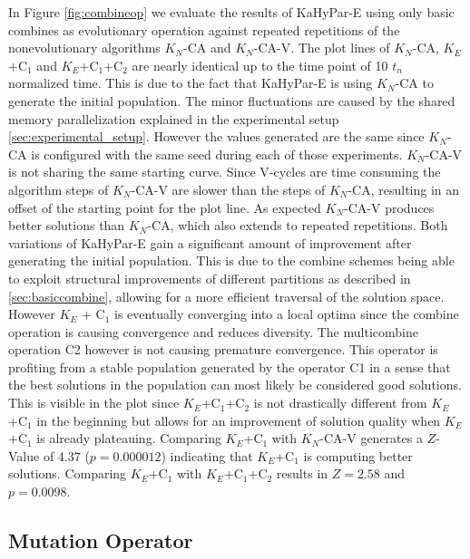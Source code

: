 \documentclass[a4paper,12pt,titlepage, BCOR7mm,headsepline]{scrbook}
\numberwithin{equation}{section}
\begin{document}
In Figure \ref{fig:combineop} we evaluate the results of KaHyPar-E using only basic combines as evolutionary operation against repeated repetitions of the nonevolutionary algorithms $K_N$-CA and $K_N$-CA-V. The plot lines of $K_N$-CA, $K_E$+C$_1$ and $K_E$+C$_1$+C$_2$ are nearly identical up to the time point of 10 $t_n$ normalized time. This is due to the fact that KaHyPar-E is using $K_N$-CA to generate the initial population. The minor fluctuations are caused by the shared memory parallelization explained in the experimental setup \ref{sec:experimental_setup}. However the values generated are the same since $K_N$-CA is configured with the same seed during each of those experiments. $K_N$-CA-V is not sharing the same starting curve. Since V-cycles are time consuming the algorithm steps of $K_N$-CA-V are slower than the steps of $K_N$-CA, resulting in an offset of the starting point for the plot line. As expected $K_N$-CA-V produces better solutions than $K_N$-CA, which also extends to repeated repetitions. Both variations of KaHyPar-E gain a significant amount of improvement after generating the initial population. This is due to the combine schemes being able to exploit structural improvements of different partitions as described in \ref{sec:basiccombine}, allowing for a more efficient traversal of the solution space. However $K_E$ + C$_1$ is eventually converging into a local optima since the combine operation is causing convergence and reduces diversity. The multicombine operation C2 however is not causing premature convergence. This operator is profiting from a stable population generated by the operator C1 in a sense that the best solutions in the population can most likely be considered good solutions. This is visible in the plot since $K_E$+C$_1$+C$_2$ is not drastically different from $K_E$+C$_1$ in the beginning but allows for an improvement of solution quality when $K_E$+C$_1$ is already plateauing. Comparing $K_E$+C$_1$ with $K_N$-CA-V generates a $Z$-Value of 4.37 ($p = 0.000012$) indicating that $K_E$+C$_1$ is computing better solutions. Comparing $K_E$+C$_1$ with $K_E$+C$_1$+C$_2$ results in $Z = 2.58$ and $p = 0.0098$. 
\subsection{Mutation Operator}
\end{document}
